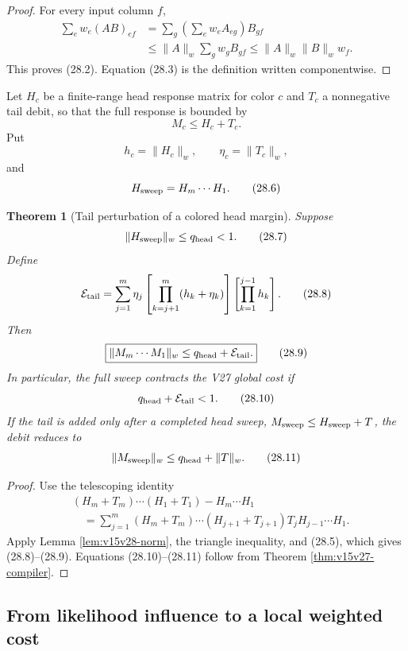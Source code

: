 \documentclass[11pt]{article}
\newtheorem{theorem}{Theorem}[section]
\theoremstyle{remark}
\begin{document}
\begin{proof}
For every input column \(f\),
\[
\begin{aligned}
 \sum_e w_e(AB)_{ef}
 &=
 \sum_g\left(\sum_e w_eA_{eg}\right)B_{gf}\\
 &\le
 \|A\|_w\sum_g w_gB_{gf}
 \le
 \|A\|_w\|B\|_w w_f.
\end{aligned}
\]
This proves (28.2).  Equation (28.3) is the definition written
componentwise.
\end{proof}

Let \(H_c\) be a finite-range head response matrix for color \(c\)
and \(T_c\) a nonnegative tail debit, so that the full response is
bounded by
\[
 M_c\le H_c+T_c.                                           \tag{28.4}
\]
Put
\[
 h_c=\|H_c\|_w,\qquad\eta_c=\|T_c\|_w,                      \tag{28.5}
\]
and
\[
 H_{\rm sweep}=H_m\cdots H_1.                              \tag{28.6}
\]

\begin{theorem}[Tail perturbation of a colored head margin]
\label{thm:v15v28-perturb}
Suppose
\[
 \|H_{\rm sweep}\|_w\le q_{\rm head}<1.                    \tag{28.7}
\]
Define
\[
 {\cal E}_{\rm tail}
 =
 \sum_{j=1}^m
 \eta_j
 \left[\prod_{k=j+1}^m(h_k+\eta_k)\right]
 \left[\prod_{k=1}^{j-1}h_k\right].                        \tag{28.8}
\]
Then
\[
 \boxed{
 \|M_m\cdots M_1\|_w
 \le q_{\rm head}+{\cal E}_{\rm tail}.}                    \tag{28.9}
\]
In particular, the full sweep contracts the V27 global cost if
\[
 q_{\rm head}+{\cal E}_{\rm tail}<1.                       \tag{28.10}
\]
If the tail is added only after a completed head sweep,
\(M_{\rm sweep}\le H_{\rm sweep}+T\), the debit reduces to
\[
 \|M_{\rm sweep}\|_w\le q_{\rm head}+\|T\|_w.               \tag{28.11}
\]
\end{theorem}

\begin{proof}
Use the telescoping identity
\[
\begin{aligned}
 &(H_m+T_m)\cdots(H_1+T_1)-H_m\cdots H_1\\
 &\quad=
 \sum_{j=1}^m
 (H_m+T_m)\cdots(H_{j+1}+T_{j+1})
 T_jH_{j-1}\cdots H_1.                                    \tag{28.12}
\end{aligned}
\]
Apply Lemma \ref{lem:v15v28-norm}, the triangle inequality, and
(28.5), which gives (28.8)--(28.9).  Equations
(28.10)--(28.11) follow from Theorem
\ref{thm:v15v27-compiler}.
\end{proof}

\subsection{From likelihood influence to a local weighted cost}
\end{document}
